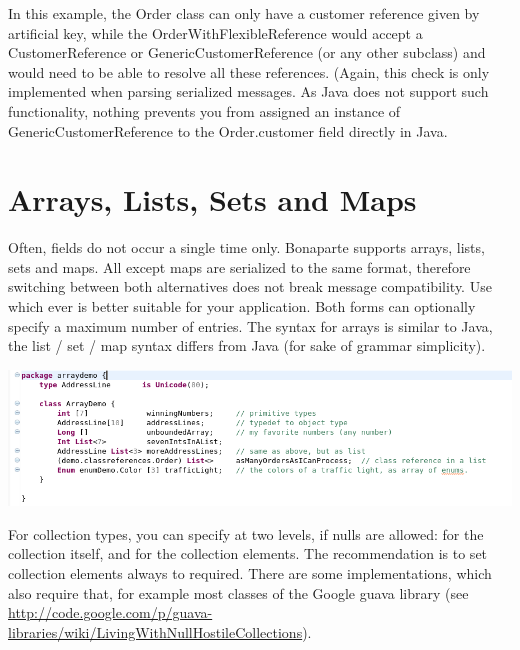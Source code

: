 \documentclass[11pt,a4paper,oneside]{article}
\begin{document}
\noindent In this example, the {\ttfamily Order} class can only have a customer reference given by artificial key, while the {\ttfamily OrderWithFlexibleReference}
would accept a {\ttfamily CustomerReference} or {\ttfamily GenericCustomerReference} (or any other subclass) and would need to be able to resolve all these
references. (Again, this check is only implemented when parsing serialized messages. As Java does not support such functionality, nothing prevents you
from assigned an instance of {\ttfamily GenericCustomerReference}  to the {\ttfamily Order.customer} field directly in Java.



\section{Arrays, Lists, Sets and Maps}
Often, fields do not occur a single time only. Bonaparte supports arrays, lists, sets and maps. All except maps are
serialized to the same format, therefore switching between both alternatives does not break message compatibility.
Use which ever is better suitable for your application.
Both forms can optionally specify a maximum number of entries. 
The syntax for arrays is similar to Java, the list / set / map syntax differs from Java (for sake of grammar simplicity).

\vspace{2mm}

\hspace{1cm}\includegraphics[scale=0.5]{images/tut1-015-arrays.png}

For collection types, you can specify at two levels, if {\ttfamily null}s are allowed: for the collection itself, and for the
collection elements.  The recommendation is to set collection elements always to {\ttfamily required}. There are some
implementations, which also require that, for example most classes of the Google {\ttfamily guava} library (see
\url{http://code.google.com/p/guava-libraries/wiki/LivingWithNullHostileCollections}).

\vspace{2mm}
\end{document}
